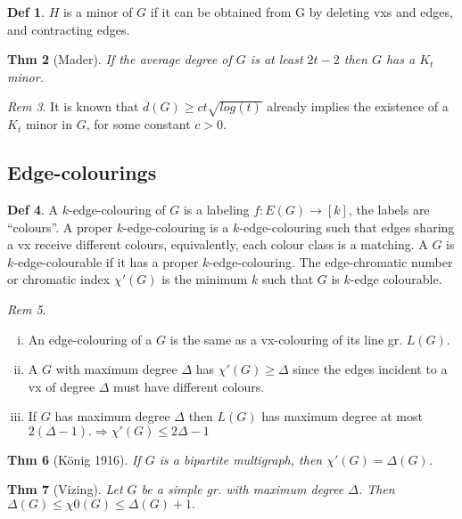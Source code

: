 \documentclass[11pt, fleqn, a4paper, landscape]{article}
\theoremstyle{plain} %
\newtheorem{thm}{Thm}
\theoremstyle{remark} %
\newtheorem{rem}[thm]{Rem}
\theoremstyle{definition} %
\newtheorem{defi}[thm]{Def}
\begin{document}
\begin{multicols}{5}
\begin{defi}
$H$ is a minor of $G$ if it can be obtained from G by deleting vxs and edges, and contracting edges.
\end{defi}
\addtocounter{thm}{2}
\begin{thm}[Mader]
If the average degree of $G$ is at least $2t-2$ then $G$ has a $K_t$ minor.
\end{thm}

\begin{rem}
It is known that $\overline{d}(G) \ge ct\sqrt{log(t)}$ already implies the existence of a $K_t$ minor in $G$, for some constant $c > 0$.
\end{rem}
\subsection{Edge-colourings}
\begin{defi}
A $k$-edge-colouring of $G$ is a labeling $f : E(G) \to [k]$, the labels are “colours”. A proper $k$-edge-colouring is a $k$-edge-colouring such that edges sharing a vx receive different colours, equivalently, each colour class is a matching. A $G$ is $k$-edge-colourable if it has a
proper $k$-edge-colouring. The edge-chromatic number or chromatic index $\chi'(G)$ is the minimum $k$ such that $G$ is $k$-edge colourable.
\end{defi}

\begin{rem}
\begin{enumerate}[(i)]
\item An edge-colouring of a $G$ is the same as a vx-colouring of its line gr. $L(G)$.
\item A $G$ with maximum degree $\Delta$ has $\chi'(G) \ge \Delta$ since the edges incident to a vx of degree $\Delta$ must have different colours.
\item If $G$ has maximum degree $\Delta$ then $L(G)$ has maximum degree at most $2(\Delta-1).\Rightarrow \chi'(G) \le 2\Delta - 1$ 
\end{enumerate}
\end{rem}

\begin{thm}[König 1916]
If $G$ is a bipartite multigraph, then $\chi'(G) = \Delta(G)$.
\end{thm}

\begin{thm}[Vizing]
Let $G$ be a simple gr. with maximum degree $\Delta$. Then $\Delta(G)\le \chi0(G) \le \Delta(G) + 1.$
\end{thm}
\addtocounter{thm}{1}


\end{multicols}
\end{document}
